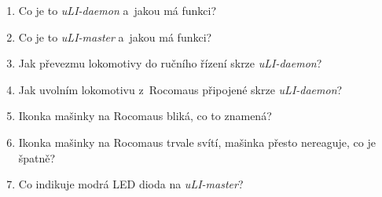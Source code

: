 \documentclass[12pt,a4paper]{article}
\begin{document}
\begin{enumerate}[leftmargin=*]
	\item Co je to \textit{uLI-daemon} a~jakou má funkci?
	
	\item Co je to \textit{uLI-master} a~jakou má funkci?
	
	\item Jak převezmu lokomotivy do ručního řízení skrze \textit{uLI-daemon}?
	
	\item Jak uvolním lokomotivu z~Rocomaus připojené skrze \textit{uLI-daemon}?
	
	\item Ikonka mašinky na Rocomaus bliká, co to znamená?
	
	\item Ikonka mašinky na Rocomaus trvale svítí, mašinka přesto nereaguje, co je špatně?
	
	\item Co indikuje modrá LED dioda na \textit{uLI-master}?
	
\end{enumerate}
\end{document}
